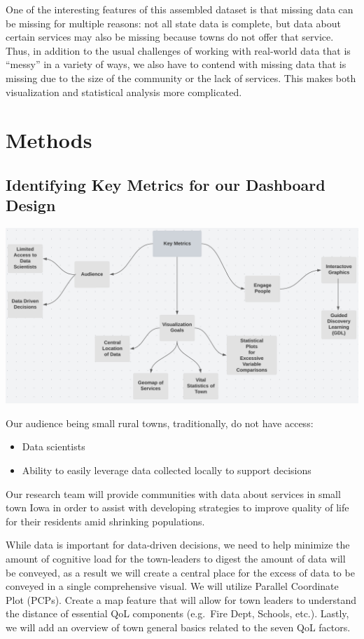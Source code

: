 \documentclass[letterpaper,inpress]{jdsart}
\begin{document}
One of the interesting features of this assembled dataset is that missing data can be missing for multiple reasons: not all state data is complete, but data about certain services may also be missing because towns do not offer that service.
Thus, in addition to the usual challenges of working with real-world data that is ``messy'' in a variety of ways, we also have to contend with missing data that is missing due to the size of the community or the lack of services. This makes both visualization and statistical analysis more complicated.

\hypertarget{methods}{%
\section{Methods}\label{methods}}

\subsection{Identifying Key Metrics for our Dashboard Design}

\begin{center}
\includegraphics[width=.5\textwidth]{Key_Metrics}
\end{center}

Our audience being small rural towns, traditionally, do not have access:

\begin{itemize}
     \item Data scientists 
      \item Ability to easily leverage data collected locally to support decisions 
\end{itemize}

Our research team will provide communities with data about services in small town Iowa in order to assist with developing strategies to improve quality of life for their residents amid shrinking populations.

While data is important for data-driven decisions, we need to help minimize the amount of cognitive load for the town-leaders to digest the amount of data will be conveyed, as a result we will create a central place for the excess of data to be conveyed in a single comprehensive visual. We will utilize Parallel Coordinate Plot (PCPs). Create a map feature that will allow for town leaders to understand the distance of essential QoL components (e.g.~Fire Dept, Schools, etc.). Lastly, we will add an overview of town general basics related to the seven QoL factors.
\end{document}
